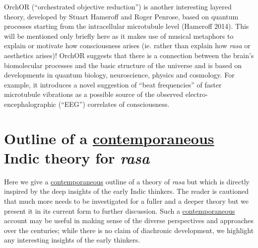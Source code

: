 OrchOR (“orchestrated objective reduction”) is another interesting layered theory, developed by Stuart Hameroff and Roger Penrose, based on quantum processes starting from the intracellular microtubule level (Hameroff 2014). This will be mentioned only briefly here as it makes use of musical metaphors to explain or motivate how consciousness arises (ie. rather than explain how \textsl{rasa} or aesthetics arises)! OrchOR suggests that there is a connection between the brain’s biomolecular processes and the basic structure of the universe and is based on developments in quantum biology, neuroscience, physics and cosmology. For example, it introduces a novel suggestion of “beat frequencies” of faster microtubule vibrations as a possible source of the observed electro-encephalographic (“EEG”) correlates of consciousness.

\section{Outline of a \underline{contemporaneous} Indic theory for \textsl{rasa}}\label{chap3-sec4}

Here we give a \underline{contemporaneous} outline of a theory of \textsl{rasa} but which is directly inspired by the deep insights of the early Indic thinkers. The reader is cautioned that much more needs to be investigated for a fuller and a deeper theory but we present it in its current form to further discussion. Such a \underline{contemporaneous} account may be useful in making sense of the diverse perspectives and approaches over the centuries; while there is no claim of diachronic development, we highlight any interesting insights of the early thinkers.

